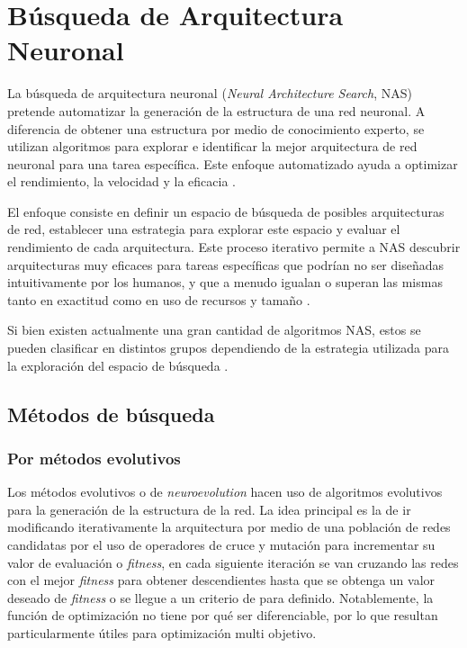 \section{Búsqueda de Arquitectura Neuronal}
\label{section2:nas}
La búsqueda de arquitectura neuronal (\textit{Neural Architecture Search}, NAS) \cite{zoph_neural_2017} pretende automatizar la generación de la estructura de una red neuronal. A diferencia de obtener una estructura por medio de conocimiento experto, se utilizan algoritmos para explorar e identificar la mejor arquitectura de red neuronal para una tarea específica. Este enfoque automatizado ayuda a optimizar el rendimiento, la velocidad y la eficacia \cite{ultralytics_busqueda_nas}.

El enfoque consiste en definir un espacio de búsqueda de posibles arquitecturas de red, establecer una estrategia para explorar este espacio y evaluar el rendimiento de cada arquitectura. Este proceso iterativo permite a NAS descubrir arquitecturas muy eficaces para tareas específicas que podrían no ser diseñadas intuitivamente por los humanos, y que a menudo igualan o superan las mismas tanto en exactitud como en uso de recursos y tamaño \cite{poyser_neural_2024}.

Si bien existen actualmente una gran cantidad de algoritmos NAS, estos se pueden clasificar en distintos grupos dependiendo de la estrategia utilizada para la exploración del espacio de búsqueda \cite{baymurzina_review_2022, white_neural_2023}.

\subsection{Métodos de búsqueda}
\subsubsection{Por métodos evolutivos}
Los métodos evolutivos o de \textit{neuroevolution} hacen uso de algoritmos evolutivos para la generación de la estructura de la red. La idea principal es la de ir modificando iterativamente la arquitectura por medio de una población de redes candidatas por el uso de operadores de cruce y mutación para incrementar su valor de evaluación o \textit{fitness}, en cada siguiente iteración se van cruzando las redes con el mejor \textit{fitness} para obtener descendientes hasta que se obtenga un valor deseado de \textit{fitness} o se llegue a un criterio de para definido. Notablemente, la función de optimización no tiene por qué ser diferenciable, por lo que resultan particularmente útiles para optimización multi objetivo. 

